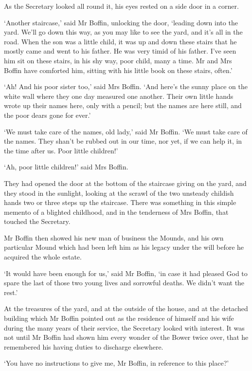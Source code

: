 As the Secretary looked all round it, his eyes rested on a side door in
a corner.

‘Another staircase,’ said Mr Boffin, unlocking the door, ‘leading down
into the yard. We’ll go down this way, as you may like to see the yard,
and it’s all in the road. When the son was a little child, it was up
and down these stairs that he mostly came and went to his father. He was
very timid of his father. I’ve seen him sit on these stairs, in his
shy way, poor child, many a time. Mr and Mrs Boffin have comforted him,
sitting with his little book on these stairs, often.’

‘Ah! And his poor sister too,’ said Mrs Boffin. ‘And here’s the sunny
place on the white wall where they one day measured one another. Their
own little hands wrote up their names here, only with a pencil; but the
names are here still, and the poor dears gone for ever.’

‘We must take care of the names, old lady,’ said Mr Boffin. ‘We must
take care of the names. They shan’t be rubbed out in our time, nor yet,
if we can help it, in the time after us. Poor little children!’

‘Ah, poor little children!’ said Mrs Boffin.

They had opened the door at the bottom of the staircase giving on the
yard, and they stood in the sunlight, looking at the scrawl of the two
unsteady childish hands two or three steps up the staircase. There was
something in this simple memento of a blighted childhood, and in the
tenderness of Mrs Boffin, that touched the Secretary.

Mr Boffin then showed his new man of business the Mounds, and his own
particular Mound which had been left him as his legacy under the will
before he acquired the whole estate.

‘It would have been enough for us,’ said Mr Boffin, ‘in case it had
pleased God to spare the last of those two young lives and sorrowful
deaths. We didn’t want the rest.’

At the treasures of the yard, and at the outside of the house, and at
the detached building which Mr Boffin pointed out as the residence
of himself and his wife during the many years of their service, the
Secretary looked with interest. It was not until Mr Boffin had shown
him every wonder of the Bower twice over, that he remembered his having
duties to discharge elsewhere.

‘You have no instructions to give me, Mr Boffin, in reference to this
place?’

